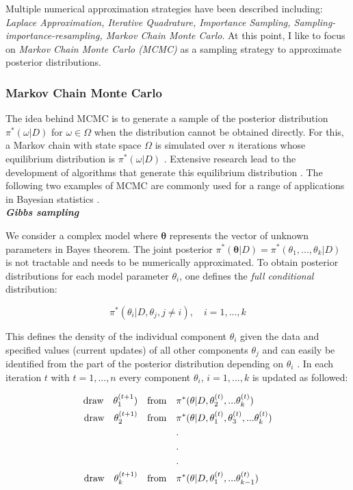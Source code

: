 Multiple numerical approximation strategies have been described including: \emph{Laplace Approximation, Iterative Quadrature, Importance Sampling, Sampling-importance-resampling, Markov Chain Monte Carlo}. At this point, I like to focus on \emph{Markov Chain Monte Carlo (MCMC)} \citep{Metropolis1953, Hastings1970} as a sampling strategy to approximate posterior distributions.

\subsubsection{Markov Chain Monte Carlo}

The idea behind MCMC is to generate a sample of the posterior distribution $\pi^*(\omega|D)$ for $\omega\in\Omega$ when the distribution cannot be obtained directly. For this, a Markov chain with state space $\Omega$ is simulated over $n$ iterations whose equilibrium distribution is $\pi^*(\omega|D)$ \citep{Bernardo2000}. Extensive research lead to the development of algorithms that generate this equilibrium distribution \citep{Casella1992, Gelfand1990, Greyer1992, Besag1993, Gelman1992}.
The following two examples of MCMC are commonly used for a range of applications in Bayesian statistics \citep{Bernardo2000}.\\

\textbf{\textit{Gibbs sampling}}

We consider a complex model where $\bm{\theta}$ represents the vector of unknown parameters in Bayes theorem. The joint posterior $\pi^*(\bm{\theta}|D)=\pi^*(\theta_1,...,\theta_k|D)$ is not tractable and needs to be numerically approximated. To obtain posterior distributions for each model parameter $\theta_i$, one defines the \emph{full conditional} distribution:

\begin{equation}
\pi^*(\theta_i|D,\theta_j,j\neq{}i), \quad i=1,...,k
\end{equation}

This defines the density of the individual component $\theta_i$ given the data and specified values (current updates) of all other components $\theta_j$ \cite{Geman1984} and can easily be identified from the part of the posterior distribution depending on $\theta_i$ \citep{Bernardo2000}. In each iteration $t$ with $t=1,...,n$ every component $\theta_i,\,{}i=1,...,k$ is updated as followed:

\begin{align*}
\textnormal{draw} \quad  \theta_1^{(t+1}) \quad \textnormal{from} \quad & \pi^*(\theta|D, \theta_2^{(t)},...\theta_k^{(t)})\\
\textnormal{draw} \quad  \theta_2^{(t+1)} \quad \textnormal{from} \quad & \pi^*(\theta|D, \theta_1^{(t)},\theta_3^{(t)},...\theta_k^{(t)})\\
&.\\
&.\\
&.\\
\textnormal{draw} \quad  \theta_k^{(t+1)} \quad \textnormal{from}  \quad& \pi^*(\theta|D, \theta_1^{(t)},...\theta_{k-1}^{(t)})
\end{align*}

